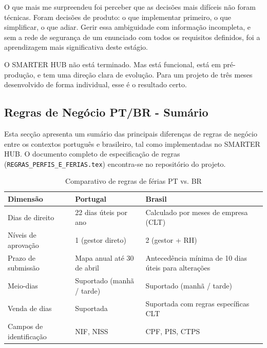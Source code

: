 \documentclass[12pt, a4paper, twoside, openright]{report}
\begin{document}
O que mais me surpreendeu foi perceber que as decisões mais difíceis não foram técnicas.
Foram decisões de produto: o que implementar primeiro, o que simplificar, o que adiar.
Gerir essa ambiguidade com informação incompleta, e sem a rede de segurança de um
enunciado com todos os requisitos definidos, foi a aprendizagem mais significativa
deste estágio.

O SMARTER HUB não está terminado. Mas está funcional, está em pré-produção, e tem
uma direção clara de evolução. Para um projeto de três meses desenvolvido de forma
individual, esse é o resultado certo.

\nocite{*}

\begin{appendices}

\chapter{Regras de Negócio PT/BR - Sumário}
\label{anx:regras}

Esta secção apresenta um sumário das principais diferenças de regras de negócio
entre os contextos português e brasileiro, tal como implementadas no SMARTER HUB.
O documento completo de especificação de regras (\texttt{REGRAS\_PERFIS\_E\_FERIAS.tex})
encontra-se no repositório do projeto.

\begin{table}[H]
  \caption{Comparativo de regras de férias PT vs. BR}
  \label{tab:ptbr}
  \small\sffamily
  \begin{tabularx}{\textwidth}{|l|X|X|}
    \hline
    \textbf{Dimensão} & \textbf{Portugal} & \textbf{Brasil} \\
    \hline
    Dias de direito & 22 dias úteis por ano & Calculado por meses de empresa (CLT) \\
    \hline
    Níveis de aprovação & 1 (gestor direto) & 2 (gestor + RH) \\
    \hline
    Prazo de submissão & Mapa anual até 30 de abril & Antecedência mínima de 10 dias úteis para alterações \\
    \hline
    Meio-dias & Suportado (manhã / tarde) & Suportado (manhã / tarde) \\
    \hline
    Venda de dias & Suportada & Suportada com regras específicas CLT \\
    \hline
    Campos de identificação & NIF, NISS & CPF, PIS, CTPS \\
    \hline
  \end{tabularx}
\end{table}

\end{appendices}
\end{document}
